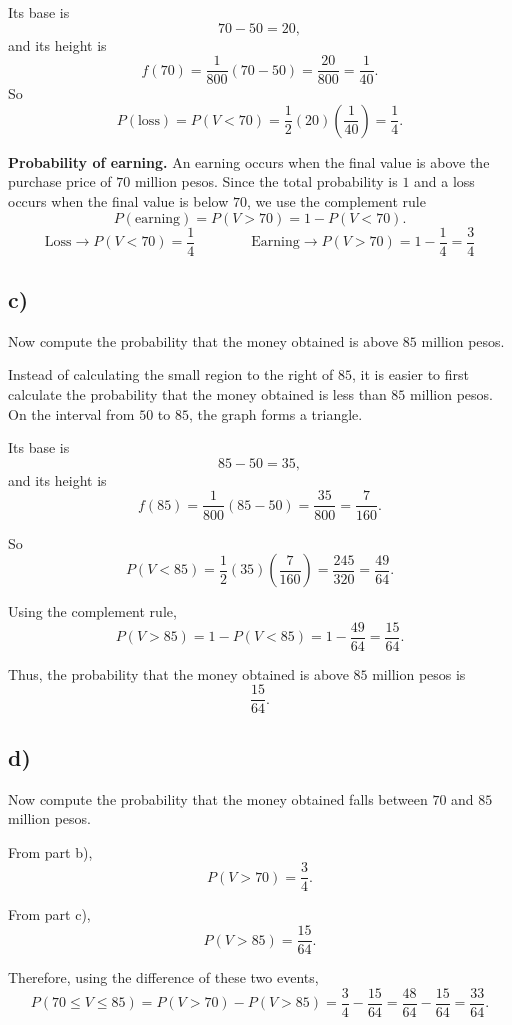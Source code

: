 	Its base is
	\[
	70-50=20,
	\]
	and its height is
	\[
	f(70)=\frac{1}{800}(70-50)=\frac{20}{800}=\frac{1}{40}.
	\]
	So
	\[
	P(\text{loss})=P(V<70)=\frac12(20)\left(\frac{1}{40}\right)=\frac14.
	\]
	
	\textbf{Probability of earning.}
	An earning occurs when the final value is above the purchase price of $70$ million pesos. Since the total probability is $1$ and a loss occurs when the final value is below $70$, we use the complement rule
	\[
	P(\text{earning})=P(V>70)=1-P(V<70).
	\]
	\[
	\text{Loss} \rightarrow P(V<70)=\frac14
	\qquad\qquad
	\text{Earning} \rightarrow P(V>70)=1-\frac14=\frac34
	\]
	
	\subsection*{c)}
	Now compute the probability that the money obtained is above $85$ million pesos.
	
	Instead of calculating the small region to the right of $85$, it is easier to first calculate the probability that the money obtained is less than $85$ million pesos. On the interval from $50$ to $85$, the graph forms a triangle.
	
	Its base is
	\[
	85-50=35,
	\]
	and its height is
	\[
	f(85)=\frac{1}{800}(85-50)=\frac{35}{800}=\frac{7}{160}.
	\]
	
	So
	\[
	P(V<85)=\frac12(35)\left(\frac{7}{160}\right)=\frac{245}{320}=\frac{49}{64}.
	\]
	
	Using the complement rule,
	\[
	P(V>85)=1-P(V<85)=1-\frac{49}{64}=\frac{15}{64}.
	\]
	
	Thus, the probability that the money obtained is above $85$ million pesos is
	\[
	\frac{15}{64}.
	\]
	
	\subsection*{d)}
	Now compute the probability that the money obtained falls between $70$ and $85$ million pesos.
	
	From part b),
	\[
	P(V>70)=\frac34.
	\]
	
	From part c),
	\[
	P(V>85)=\frac{15}{64}.
	\]
	
	Therefore, using the difference of these two events,
	\[
	P(70\le V\le 85)=P(V>70)-P(V>85)
	=\frac34-\frac{15}{64}
	=\frac{48}{64}-\frac{15}{64}
	=\frac{33}{64}.
	\]
	
